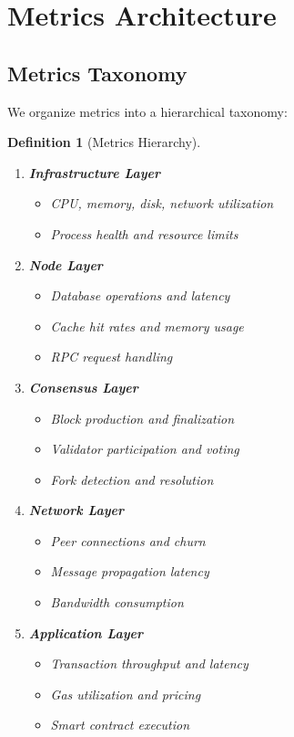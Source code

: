 \documentclass[11pt,a4paper]{article}
\newtheorem{definition}{Definition}
\begin{document}
\section{Metrics Architecture}

\subsection{Metrics Taxonomy}

We organize metrics into a hierarchical taxonomy:

\begin{definition}[Metrics Hierarchy]
\begin{enumerate}
    \item \textbf{Infrastructure Layer}
    \begin{itemize}
        \item CPU, memory, disk, network utilization
        \item Process health and resource limits
    \end{itemize}
    \item \textbf{Node Layer}
    \begin{itemize}
        \item Database operations and latency
        \item Cache hit rates and memory usage
        \item RPC request handling
    \end{itemize}
    \item \textbf{Consensus Layer}
    \begin{itemize}
        \item Block production and finalization
        \item Validator participation and voting
        \item Fork detection and resolution
    \end{itemize}
    \item \textbf{Network Layer}
    \begin{itemize}
        \item Peer connections and churn
        \item Message propagation latency
        \item Bandwidth consumption
    \end{itemize}
    \item \textbf{Application Layer}
    \begin{itemize}
        \item Transaction throughput and latency
        \item Gas utilization and pricing
        \item Smart contract execution
    \end{itemize}
\end{enumerate}
\end{definition}
\end{document}
